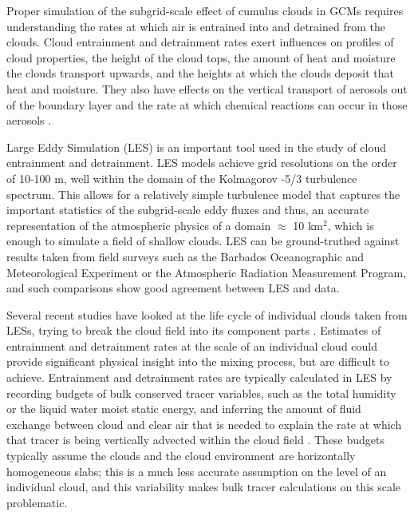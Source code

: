 \documentclass[12pt]{article}
\begin{document}
Proper simulation of the subgrid-scale effect of cumulus clouds in GCMs requires 
understanding the rates at which air is entrained into and detrained from the 
clouds. Cloud entrainment and detrainment rates exert influences on profiles of 
cloud properties, the height of the cloud tops, the amount of heat and moisture 
the clouds transport upwards, and the heights at which the clouds deposit that 
heat and moisture.  They also have effects on the vertical transport of 
aerosols out of the boundary layer and the rate at which chemical reactions can 
occur in those aerosols \citep{Barahona2007,Anldrejczuk2008}.

Large Eddy Simulation (LES) is an important tool used in the study of cloud 
entrainment and detrainment. LES models achieve grid resolutions on the order 
of 10-100 m, well within the domain of the Kolmagorov -5/3 turbulence spectrum. 
This allows for a relatively simple turbulence model that captures the 
important statistics of the subgrid-scale eddy fluxes and thus, an accurate 
representation of the atmospheric physics of a domain $\approx$ 10 km$^{2}$, 
which is enough to simulate a field of shallow clouds.  LES can be 
ground-truthed against results taken from field surveys such as the Barbados 
Oceanographic and Meteorological Experiment \citep[BOMEX;][]{Holland1973} or 
the Atmospheric Radiation Measurement \citep[ARM;][]{Brown2002} Program, and 
such comparisons show good agreement between LES and data.

Several recent studies have looked at the life cycle of individual clouds taken 
from LESs, trying to break the cloud field into its component parts 
\citep{Zhao2005,Zhao2005a,Heus2009}.  Estimates of entrainment and detrainment 
rates at the scale of an individual cloud could provide significant physical insight
into the mixing process, but are 
difficult to achieve. Entrainment and detrainment rates are typically 
calculated in LES by recording budgets of bulk conserved tracer variables, 
such as the total humidity or the liquid water moist static energy, and 
inferring the amount of fluid exchange between cloud and clear air that is 
needed to explain the rate at which that tracer is being vertically advected 
within the cloud field \citep{Siebesma1995}. These budgets typically assume 
the clouds and the cloud environment are horizontally homogeneous slabs; this 
is a much less accurate assumption on the level of an individual cloud, and 
this variability makes bulk tracer calculations on this scale problematic.
\end{document}
